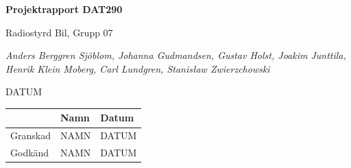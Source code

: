 \documentclass[a4paper]{article}
\begin{document}
\begin{titlepage}
\centering
{\bfseries\huge Projektrapport DAT290}

\vspace{10mm}

{\Large Radiostyrd Bil, Grupp 07}

\vspace{20mm}

{\Large \itshape{Anders Berggren Sjöblom, Johanna Gudmandsen, Gustav Holst, Joakim Junttila, Henrik Klein Moberg, Carl Lundgren, Stanisław Zwierzchowski}}

\vspace{10mm}

{DATUM}


\normalsize{
\begin{table}[b]
\centering
\begin{tabular}{|l|l|l|}  \hline
         & \bf Namn & \bf Datum   \\ \hline \hline
Granskad & NAMN     & DATUM        \\ \hline
Godkänd  & NAMN     & DATUM         \\ \hline
\end{tabular} 
\end{table}}
\end{titlepage}

\tableofcontents
\end{document}
